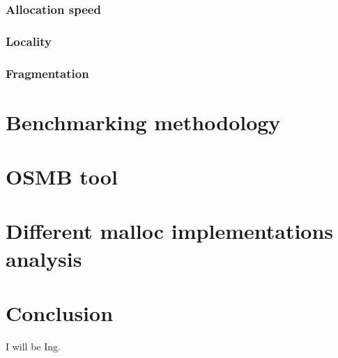 \subsection{Allocation speed}
\subsection{Locality}
\subsection{Fragmentation}
\chapter{Benchmarking methodology}
\chapter{OSMB tool}
\chapter{Different malloc implementations analysis}
\chapter{Conclusion}
I will be Ing. \cite{Pravidla}

